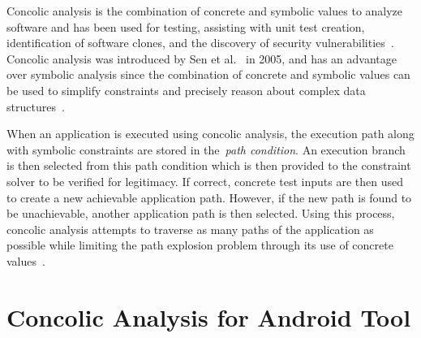 \documentclass[conference]{IEEEtran}
\begin{document}
Concolic analysis is the combination of concrete and symbolic values to analyze software and has been used for testing, assisting with unit test creation, identification of software clones, and the discovery of security vulnerabilities~\cite{Sen:2005:CCU:1081706.1081750, Godefroid_automatedwhitebox, 6671332, Krutz_Sac15}. Concolic analysis was introduced by Sen et al.~\cite{Sen:2005:CCU:1081706.1081750} in 2005, and has an advantage over symbolic analysis since the combination of concrete and symbolic values can be used to simplify constraints and precisely reason about complex data structures~\cite{4222603}.

When an application is executed using concolic analysis, the execution path along with symbolic constraints are stored in the~\emph{path condition}. An execution branch is then selected from this path condition which is then provided to the constraint solver to be verified for legitimacy. If correct, concrete test inputs are then used to create a new achievable application path. However, if the new path is found to be unachievable, another application path is then selected. Using this process, concolic analysis attempts to traverse as many paths of the application as possible while limiting the path explosion problem through its use of concrete values~\cite{Jaffar:2013:BCT:2491411.2491425}.




\section{Concolic Analysis for Android Tool}
\label{sec: caa}
\end{document}
